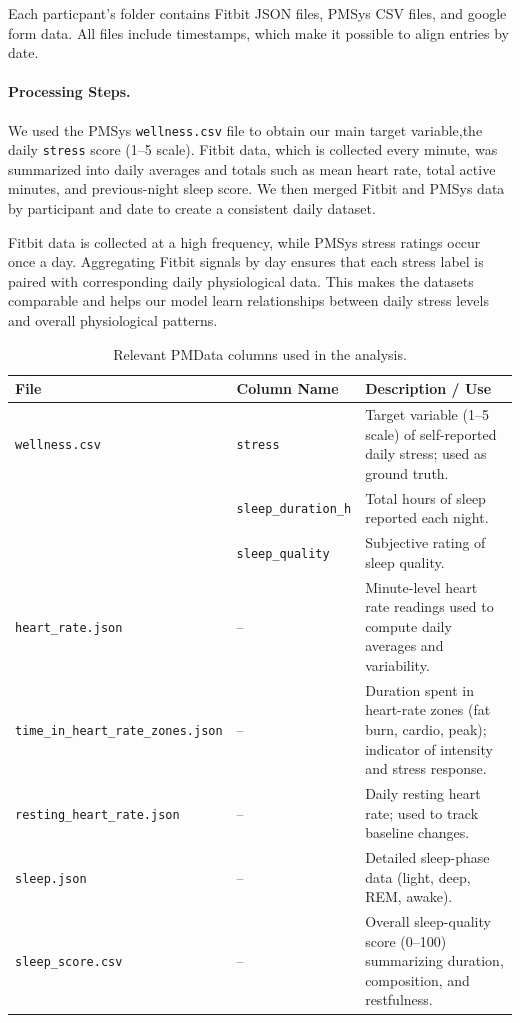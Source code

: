 \documentclass[12pt,letterpaper]{article}
\begin{document}
Each particpant's folder contains Fitbit JSON files, PMSys CSV files, and google form data. All files include timestamps, which make it possible to align entries by date. 

\paragraph{Processing Steps.} We used the PMSys \texttt{wellness.csv} file to obtain our main target variable,the daily \texttt{stress} score (1--5 scale). 
Fitbit data, which is collected every minute, was summarized into daily averages 
and totals such as mean heart rate, total active minutes, and previous-night sleep score. We then merged Fitbit and PMSys data by participant and date to create a consistent daily dataset.

Fitbit data is collected at a high frequency, while PMSys stress ratings occur once a day. Aggregating Fitbit signals by day ensures that each stress label is paired 
with corresponding daily physiological data. This makes the datasets comparable and helps our model learn relationships between daily stress levels and overall physiological patterns.


\FloatBarrier
\begin{table}[htbp]
\centering
\renewcommand{\arraystretch}{1.2} %
\setlength{\tabcolsep}{6pt}       %
\caption{Relevant PMData columns used in the analysis.}
\label{tab:pmdata-cols}
\begin{tabular}{p{3.2cm}p{3.2cm}p{7.8cm}}
\toprule
\textbf{File} & \textbf{Column Name} & \textbf{Description / Use} \\
\midrule
\texttt{wellness.csv} & \texttt{stress} & Target variable (1--5 scale) of self-reported daily stress; used as ground truth. \\
                      & \texttt{sleep\_duration\_h} & Total hours of sleep reported each night. \\
                      & \texttt{sleep\_quality} & Subjective rating of sleep quality. \\[4pt]
\texttt{heart\_rate.json} & -- & Minute-level heart rate readings used to compute daily averages and variability. \\
\texttt{time\_in\_heart\_rate\_zones.json} & -- & Duration spent in heart-rate zones (fat burn, cardio, peak); indicator of intensity and stress response. \\
\texttt{resting\_heart\_rate.json} & -- & Daily resting heart rate; used to track baseline changes. \\
\texttt{sleep.json} & -- & Detailed sleep-phase data (light, deep, REM, awake). \\
\texttt{sleep\_score.csv} & -- & Overall sleep-quality score (0–100) summarizing duration, composition, and restfulness. \\
\bottomrule
\end{tabular}
\end{table}
\end{document}
